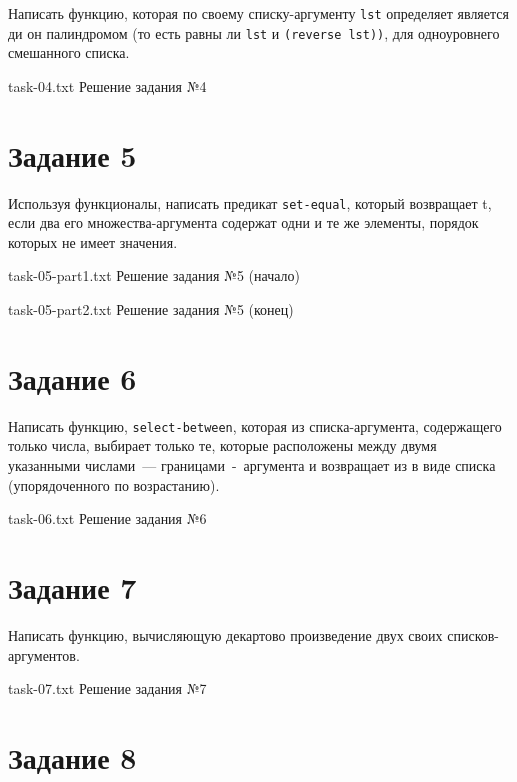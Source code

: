 Написать функцию, которая по своему списку-аргументу \texttt{lst} определяет является ди он палиндромом (то есть равны ли \texttt{lst} и \texttt{(reverse lst))}, для одноуровнего смешанного списка.

{task-04.txt} %
{Решение задания №4} %


\section{Задание 5}

Используя функционалы, написать предикат \texttt{set-equal}, который возвращает t, если два его множества-аргумента содержат одни и те же элементы, порядок которых не имеет значения.

{task-05-part1.txt} %
{Решение задания №5 (начало)} %

{task-05-part2.txt} %
{Решение задания №5 (конец)} %

\section{Задание 6}

Написать функцию, \texttt{select-between}, которая из списка-аргумента, содержащего только числа, выбирает только те, которые расположены между двумя указанными числами~--- границами~-~аргумента и возвращает из в виде списка (упорядоченного по возрастанию).

{task-06.txt} %
{Решение задания №6} %

\section{Задание 7}

Написать функцию, вычисляющую декартово произведение двух своих списков-аргументов.

{task-07.txt} %
{Решение задания №7} %

\clearpage

\section{Задание 8}

